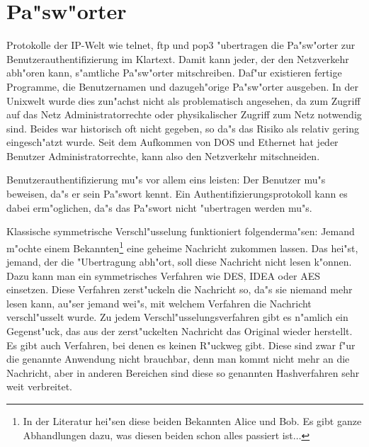 \documentclass{scrartcl}\usepackage{pslatex}\typearea{12}
\begin{document}
\section{Pa"sw"orter}
\label{passwoerter}

Protokolle der IP-Welt wie telnet, ftp und pop3 "ubertragen die
Pa"sw"orter zur Benutzerauthentifizierung im Klartext. Damit kann
jeder, der den Netzverkehr abh"oren kann, s"amtliche Pa"sw"orter
mitschreiben. Daf"ur existieren fertige Programme, die Benutzernamen
und dazugeh"orige Pa"sw"orter ausgeben. In der Unixwelt wurde dies
zun"achst nicht als problematisch angesehen, da zum Zugriff auf das
Netz Administratorrechte oder physikalischer Zugriff zum Netz
notwendig sind. Beides war historisch oft nicht gegeben, so da"s das
Risiko als relativ gering eingesch"atzt wurde. Seit dem Aufkommen von
DOS und Ethernet hat jeder Benutzer Administratorrechte, kann also den
Netzverkehr mitschneiden.

Benutzerauthentifizierung mu"s vor allem eins leisten: Der Benutzer
mu"s beweisen, da"s er sein Pa"swort kennt. Ein
Authentifizierungsprotokoll kann es dabei erm"oglichen, da"s das
Pa"swort nicht "ubertragen werden mu"s.

Klassische symmetrische Verschl"usselung funktioniert folgenderma"sen:
Jemand m"ochte einem Bekannten\footnote{In der Literatur hei"sen diese
  beiden Bekannten Alice und Bob. Es gibt ganze Abhandlungen dazu, was
  diesen beiden schon alles passiert ist$\ldots$} eine geheime
Nachricht zukommen lassen. Das hei"st, jemand, der die "Ubertragung
abh"ort, soll diese Nachricht nicht lesen k"onnen. Dazu kann man ein
symmetrisches Verfahren wie DES, IDEA oder AES einsetzen. Diese
Verfahren zerst"uckeln die Nachricht so, da"s sie niemand mehr lesen
kann, au"ser jemand wei"s, mit welchem Verfahren die Nachricht
verschl"usselt wurde. Zu jedem Verschl"usselungsverfahren gibt es
n"amlich ein Gegenst"uck, das aus der zerst"uckelten Nachricht das
Original wieder herstellt. Es gibt auch Verfahren, bei denen es keinen
R"uckweg gibt. Diese sind zwar f"ur die genannte Anwendung nicht
brauchbar, denn man kommt nicht mehr an die Nachricht, aber in anderen
Bereichen sind diese so genannten Hashverfahren sehr weit verbreitet.
\end{document}
